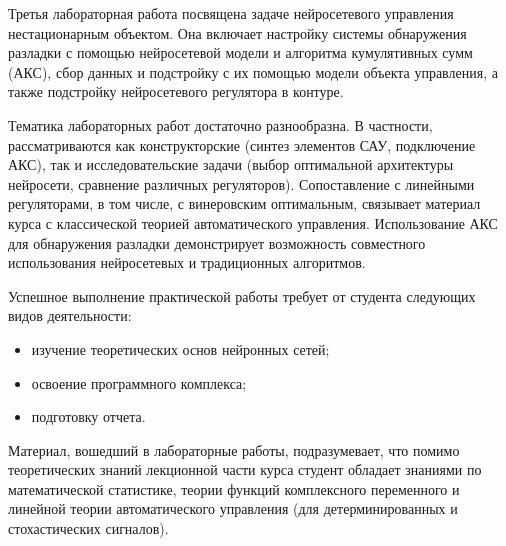 Третья лабораторная работа посвящена задаче нейросетевого управления
нестационарным объектом.  Она включает настройку системы обнаружения
разладки с помощью нейросетевой модели и алгоритма кумулятивных сумм
(АКС), сбор данных и подстройку с их помощью модели объекта
управления, а также подстройку нейросетевого регулятора в контуре.

Тематика лабораторных работ достаточно разнообразна.  В частности,
рассматриваются как конструкторские (синтез элементов САУ, подключение
АКС), так и исследовательские задачи (выбор оптимальной архитектуры
нейросети, сравнение различных регуляторов).  Сопоставление с
линейными регуляторами, в том числе, с винеровским оптимальным,
связывает материал курса с классической теорией автоматического
управления.  Использование АКС для обнаружения разладки демонстрирует
возможность совместного использования нейросетевых и традиционных
алгоритмов.


Успешное выполнение практической работы требует от студента следующих
видов деятельности:

\begin{itemize}

\item изучение теоретических основ нейронных сетей;

\item освоение программного комплекса;

\item подготовку отчета.

\end{itemize}

Материал, вошедший в лабораторные работы, подразумевает, что помимо
теоретических знаний лекционной части курса студент обладает знаниями
по математической статистике, теории функций комплексного переменного
и линейной теории автоматического управления (для детерминированных и
стохастических сигналов).

